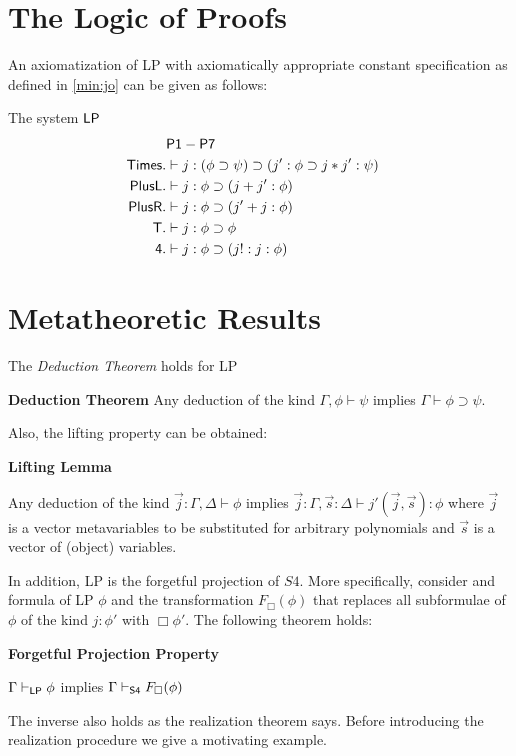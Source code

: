 \section{The Logic of Proofs}
An axiomatization of \ac{LP} with axiomatically appropriate constant specification as defined in \ref{min:jo} can be given
as follows:
	\begin{mdframed}
	The system $\sf{LP}$ 
	\begin{align*}
	& \sf{P1-P7}\\
	 \sf{Times}.& \vdash j:(\phi\supset\psi)\supset(j':\phi\supset j*j':\psi)&\\
	  \sf{PlusL}.& \vdash j:\phi\supset(j+j':\phi)&\\
	  \sf{PlusR}.& \vdash j:\phi\supset(j'+j:\phi)&\\
	 \sf{T}.& \vdash j:\phi\supset\phi\\
	\sf{4}. &\vdash j:\phi\supset (j!:j:\phi)
		\end{align*}
	
   \end{mdframed}
\section{Metatheoretic Results}
The \emph{Deduction Theorem} holds for \ac{LP}
\begin{mdframed}
\textbf{Deduction Theorem}
Any deduction of the kind $\Gamma,\phi\vdash\psi$ implies $\Gamma\vdash \phi\supset\psi$.
\end{mdframed}
Also, the lifting property can be obtained:
\begin{mdframed}
\textbf{Lifting Lemma}

Any deduction of the kind $\vec{j}:\Gamma,\Delta\vdash\phi$ implies $\vec{j}:\Gamma,\vec{s}:\Delta\vdash j'(\vec{j},\vec{s}):\phi$ where $\vec{j}$ is a vector metavariables to be substituted for arbitrary polynomials and $\vec{s}$ is a vector of (object) variables. 

\end{mdframed}
In addition, \ac{LP} is the forgetful projection of {\sf $S4$}. More specifically, consider and formula of \ac{LP} $\phi$ and the transformation $F_\Box(\phi)$ that replaces all subformulae of $\phi$ of the kind $j:\phi'$ with $\Box\phi'$. The following theorem holds:
\begin{mdframed}
\textbf{Forgetful Projection Property}

$\Gamma\vdash_{\sf LP}\phi$ implies $\Gamma\vdash_{\sf{ S4}}F_{\Box}(\phi)$ 

\end{mdframed}
  The inverse also holds as the realization theorem says. Before introducing the realization procedure we give a motivating example.
  
